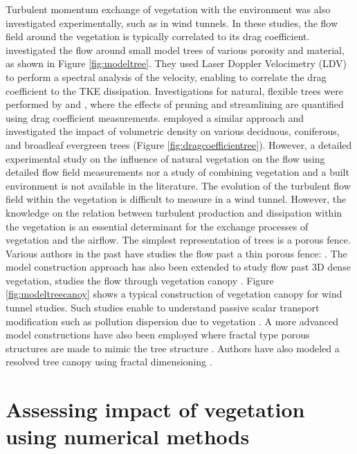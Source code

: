 Turbulent momentum exchange of vegetation with the environment was also investigated experimentally, such as in wind tunnels. In these studies, the flow field around the vegetation is typically correlated to its drag coefficient. \cite{Gromke2008a} investigated the flow around small model trees of various porosity and material, as shown in Figure \ref{fig:modeltree}. They used Laser Doppler Velocimetry (LDV) to perform a spectral analysis of the velocity, enabling to correlate the drag coefficient to the TKE dissipation. Investigations for natural, flexible trees were performed by \cite{Rudnicki2004} and \cite{Vollsinger2005}, where the effects of pruning and streamlining are quantified using drag coefficient measurements. \cite{Cao2012} employed a similar approach and investigated the impact of volumetric density on various deciduous, coniferous, and broadleaf evergreen trees (Figure \ref{fig:dragcoefficientree}). However, a detailed experimental study on the influence of natural vegetation on the flow using detailed flow field measurements nor a study of combining vegetation and a built environment is not available in the literature. The evolution of the turbulent flow field within the vegetation is difficult to measure in a wind tunnel. However, the knowledge on the relation between turbulent production and dissipation within the vegetation is an essential determinant for the exchange processes of vegetation and the airflow. The simplest representation of trees is a porous fence. Various authors in the past have studies the flow past a thin porous fence: \citep{Gandemer1979, Dong2010, Perera1981,Hagen1971,Conan2015}. The model construction approach has also been extended to study flow past 3D dense vegetation, studies the flow through vegetation canopy \citep{Conan2015,Poggi2004}. Figure \ref{fig:modeltreecanoy} shows a typical construction of vegetation canopy for wind tunnel studies. Such studies enable to understand passive scalar transport modification such as pollution dispersion due to vegetation \citep{Gromke2011,Gromke2008}. A more advanced model constructions have also been employed where fractal type porous structures are made to mimic the tree structure \citep{McClure2017}. Authors have also modeled a resolved tree canopy using fractal dimensioning \citep{Bai2012,Bai2014a}. 

\section{Assessing impact of vegetation using numerical methods}

